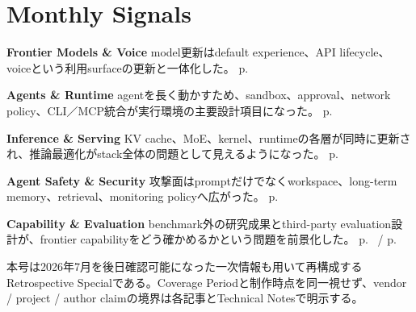 \section*{Monthly Signals}
\smallskip
\noindent\textbf{Frontier Models \& Voice} model更新はdefault experience、API lifecycle、voiceという利用surfaceの更新と一体化した。 \hfill{\footnotesize p.~\pageref{pkg:frontier-models-may}}\par
\smallskip
\noindent\textbf{Agents \& Runtime} agentを長く動かすため、sandbox、approval、network policy、CLI／MCP統合が実行環境の主要設計項目になった。 \hfill{\footnotesize p.~\pageref{pkg:agents-runtime-may}}\par
\smallskip
\noindent\textbf{Inference \& Serving} KV cache、MoE、kernel、runtimeの各層が同時に更新され、推論最適化がstack全体の問題として見えるようになった。 \hfill{\footnotesize p.~\pageref{pkg:inference-serving-may}}\par
\smallskip
\noindent\textbf{Agent Safety \& Security} 攻撃面はpromptだけでなくworkspace、long-term memory、retrieval、monitoring policyへ広がった。 \hfill{\footnotesize p.~\pageref{pkg:agent-safety-security-may}}\par
\smallskip
\noindent\textbf{Capability \& Evaluation} benchmark外の研究成果とthird-party evaluation設計が、frontier capabilityをどう確かめるかという問題を前景化した。 \hfill{\footnotesize p.~\pageref{pkg:capability-evaluation-may} / p.~\pageref{pkg:paper-watch-may}}\par
\medskip
\begin{claimboundary}
本号は2026年7月を後日確認可能になった一次情報も用いて再構成するRetrospective Specialである。Coverage Periodと制作時点を同一視せず、vendor / project / author claimの境界は各記事とTechnical Notesで明示する。
\end{claimboundary}
\medskip
\tableofcontents
